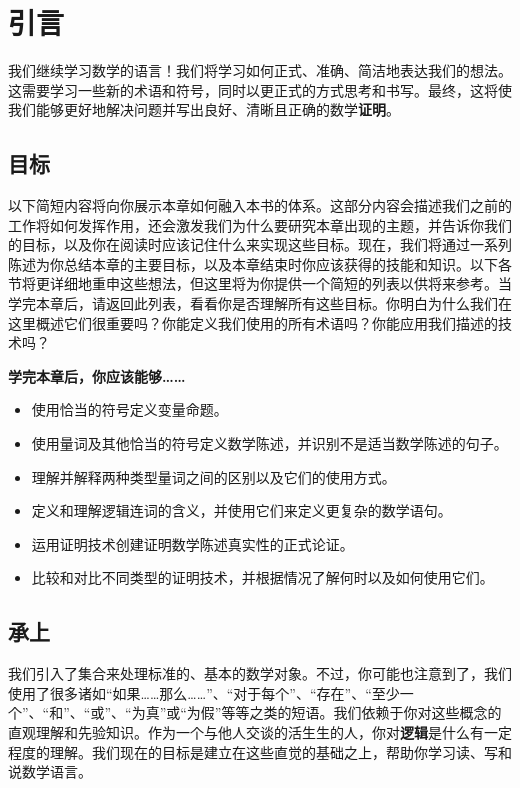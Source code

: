 \section{引言}

我们继续学习数学的语言！我们将学习如何正式、准确、简洁地表达我们的想法。这需要学习一些新的术语和符号，同时以更正式的方式思考和书写。最终，这将使我们能够更好地解决问题并写出良好、清晰且正确的数学\textbf{证明}。

\subsection{目标}

以下简短内容将向你展示本章如何融入本书的体系。这部分内容会描述我们之前的工作将如何发挥作用，还会激发我们为什么要研究本章出现的主题，并告诉你我们的目标，以及你在阅读时应该记住什么来实现这些目标。现在，我们将通过一系列陈述为你总结本章的主要目标，以及本章结束时你应该获得的技能和知识。以下各节将更详细地重申这些想法，但这里将为你提供一个简短的列表以供将来参考。当学完本章后，请返回此列表，看看你是否理解所有这些目标。你明白为什么我们在这里概述它们很重要吗？你能定义我们使用的所有术语吗？你能应用我们描述的技术吗？

\textbf{学完本章后，你应该能够……}

\begin{itemize}
    \item 使用恰当的符号定义变量命题。
    \item 使用量词及其他恰当的符号定义数学陈述，并识别不是适当数学陈述的句子。
    \item 理解并解释两种类型量词之间的区别以及它们的使用方式。
    \item 定义和理解逻辑连词的含义，并使用它们来定义更复杂的数学语句。
    \item 运用证明技术创建证明数学陈述真实性的正式论证。
    \item 比较和对比不同类型的证明技术，并根据情况了解何时以及如何使用它们。
\end{itemize}

\subsection{承上}

我们引入了集合来处理标准的、基本的数学对象。不过，你可能也注意到了，我们使用了很多诸如``如果……那么……''、``对于每个''、``存在''、``至少一个''、``和''、``或''、``为真''或``为假''等等之类的短语。我们依赖于你对这些概念的直观理解和先验知识。作为一个与他人交谈的活生生的人，你对\textbf{逻辑}是什么有一定程度的理解。我们现在的目标是建立在这些直觉的基础之上，帮助你学习读、写和说数学语言。

